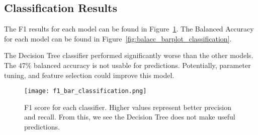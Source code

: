 
\subsection{Classification Results}
\setlength{\parindent}{10ex}
The F1 results for each model can be found in Figure~\ref{fig:f1_barplot_classification}.
The Balanced Accuracy for each model can be found in Figure~\ref{fig:balacc_barplot_classification}.

\par
The Decision Tree classifier performed significantly worse than the other models.
The 47\% balanced accuracy is not usable for predictions.
Potentially, parameter tuning, and feature selection could improve this model.


\begin{figure}[htp]
    \centering
    \texttt{[image: f1\_bar\_classification.png]}
    \caption{F1 score for each classifier. Higher values represent better precision and recall. From this, we see the Decision Tree does not make useful predictions.}
    \label{fig:f1_barplot_classification}
\end{figure}


